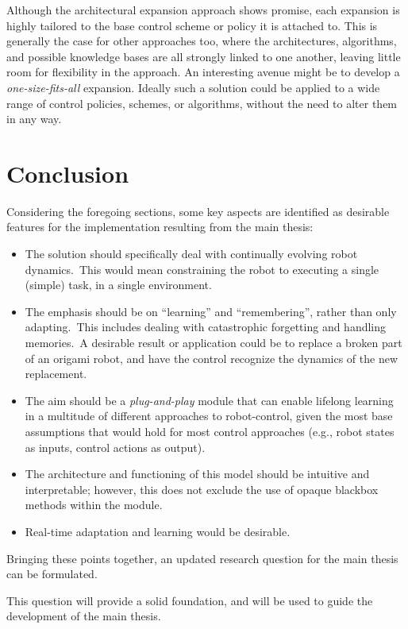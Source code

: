 Although the architectural expansion approach shows promise, each expansion is highly tailored to the base control scheme or policy it is attached to.
This is generally the case for other approaches too, where the architectures, algorithms, and possible knowledge bases are all strongly linked to one another, leaving little room for flexibility in the approach.
An interesting avenue might be to develop a \emph{one-size-fits-all} expansion.
Ideally such a solution could be applied to a wide range of control policies, schemes, or algorithms,  without the need to alter them in any way.


\section{Conclusion}\label{sec:conlusion}
Considering the foregoing sections, some key aspects are identified as desirable features for the implementation resulting from the main thesis:

\begin{itemize}
    \item The solution should specifically deal with continually evolving robot dynamics.\ This would mean constraining the robot to executing a single (simple) task, in a single environment.
    \item The emphasis should be on ``learning'' and ``remembering'', rather than only adapting.\ This includes dealing with catastrophic forgetting and handling memories.\ A desirable result or application could be to replace a broken part of an origami robot, and have the control recognize the dynamics of the new replacement.
    \item The aim should be a \emph{plug-and-play} module that can enable lifelong learning in a multitude of different approaches to robot-control, given the most base assumptions that would hold for most control approaches (e.g., robot states as inputs, control actions as output).
    \item The architecture and functioning of this model should be intuitive and interpretable; however, this does not exclude the use of opaque blackbox methods within the module.
    \item Real-time adaptation and learning would be desirable.
\end{itemize}

Bringing these points together, an updated research question for the main thesis can be formulated.

\begin{displayquote}
\end{displayquote}

This question will provide a solid foundation, and will be used to guide the development of the main thesis.

